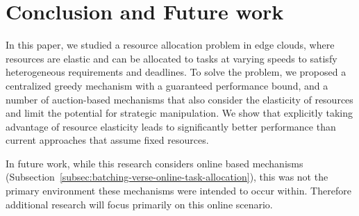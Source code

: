 \section{Conclusion and Future work}\label{sec:conclusion-and-future-work}
In this paper, we studied a resource allocation problem in edge clouds, where resources are elastic and can be
allocated to tasks at varying speeds to satisfy heterogeneous requirements and deadlines. To solve the problem,
we proposed a centralized greedy mechanism with a guaranteed performance bound, and a number of auction-based
mechanisms that also consider the elasticity of resources and limit the potential for strategic manipulation. We show
that explicitly taking advantage of resource elasticity leads to significantly better performance than current
approaches that assume fixed resources.

In future work, while this research considers online based mechanisms
(Subsection~\ref{subsec:batching-verse-online-task-allocation}), this was not the primary environment these mechanisms
were intended to occur within. Therefore additional research will focus primarily on this online scenario.
